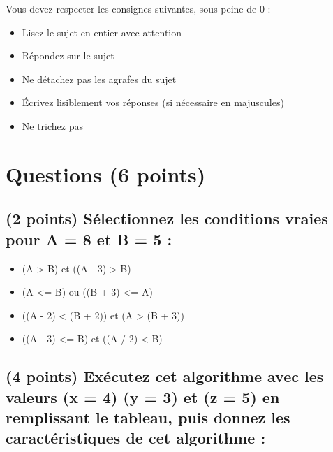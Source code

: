 \documentclass[11pt,a4paper]{article}
\begin{document}
\MakeExamTitle                   %


\bigskip

Vous devez respecter les consignes suivantes, sous peine de 0 :

\begin{itemize}
\item Lisez le sujet en entier avec attention
\item Répondez sur le sujet
\item Ne détachez pas les agrafes du sujet
\item \'Ecrivez lisiblement vos réponses (si nécessaire en majuscules)
\item Ne trichez pas
\end{itemize}



\section{Questions (6 points)}

\subsection{(2 points) Sélectionnez les conditions vraies pour A = 8 et B = 5 : }

\bigskip

\begin{itemize}
  \item[\CaseCoche] (A > B) et ((A - 3) > B)  %
  \item[\checkmark] (A <= B) ou ((B + 3) <= A)  %
  \item[\CaseCoche] ((A - 2) < (B + 2)) et (A > (B + 3))  %
  \item[\checkmark] ((A - 3) <= B) et ((A / 2) < B)  %
\end{itemize}


\medskip


\subsection{(4 points) Exécutez cet algorithme avec les valeurs (x = 4) (y = 3) et (z = 5) en remplissant le tableau, puis donnez les caractéristiques de cet algorithme : }
\end{document}
